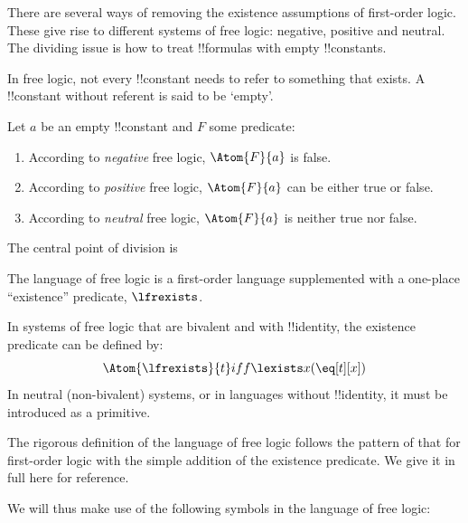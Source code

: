 \documentclass[../../../include/open-logic-section]{subfiles}
\begin{document}


There are several ways of removing the existence assumptions of
first-order logic. These give rise to different systems of free logic:
negative, positive and neutral. The dividing issue is how to treat 
!!{formula}s with empty !!{constant}s.

\begin{explain}
In free logic, not every !!{constant} needs to refer to something that exists.
A !!{constant} without referent is said to be `empty'. 
\end{explain}

Let $a$ be an empty !!{constant} and $F$ some predicate:

\begin{enumerate}
  \item According to \emph{negative} free logic, $\Atom{F}{a}$ is false.
  \item According to \emph{positive} free logic, $\Atom{F}{a}$ can be either
  true or false.
  \item According to \emph{neutral} free logic, $\Atom{F}{a}$ is neither
  true nor false.
\end{enumerate}



The central point of division is 


The language of free logic is a first-order language supplemented with a 
one-place ``existence'' predicate, $\lfrexists$.

\begin{explain}
In systems of free logic that are bivalent and with !!{identity}, the 
existence predicate can be defined by:
$$\Atom{\lfrexists}{t} iff \lexists x (\eq[t][x])$$
In neutral (non-bivalent) systems, or in languages without !!{identity}, it
must be introduced as a primitive.
\end{explain}


The rigorous definition of the language of free logic follows the pattern
of that for first-order logic with the simple addition of the existence
predicate. We give it in full here for reference.

We will thus make use of the following symbols in the language of 
free logic: 
\end{document}
